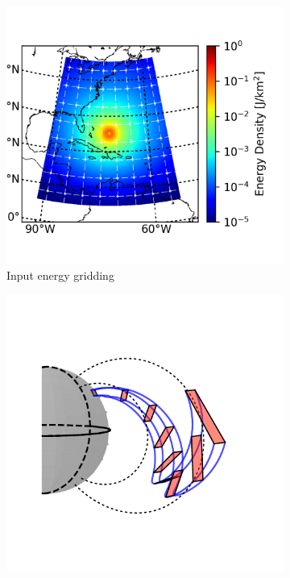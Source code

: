     \begin{figure}[h!]
    \centering
    \begin{subfigure}[t]{0.45\textwidth}
    \centering
        	\includegraphics{figures/input_energy_with_grid.png}
	\caption{Input energy gridding}
        \label{fig:input_energy_grid}
    \end{subfigure}\hfill
    \begin{subfigure}[t]{0.45\textwidth}
    \centering
        	\includegraphics[trim={1cm 0.25cm 1cm 1cm},clip]{figures/interpolation_globe1.pdf}

\end{subfigure}
\end{figure}
